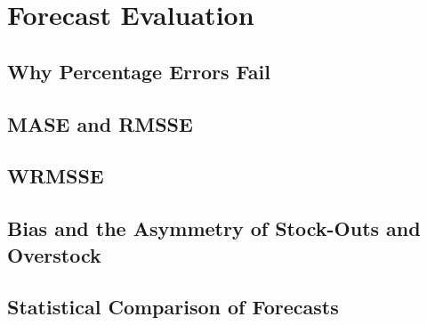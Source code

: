 \chapter{Forecast Evaluation}
\label{ch:evaluation}

\section{Why Percentage Errors Fail}

\section{MASE and RMSSE}

\section{WRMSSE}

\section{Bias and the Asymmetry of Stock-Outs and Overstock}

\section{Statistical Comparison of Forecasts}

